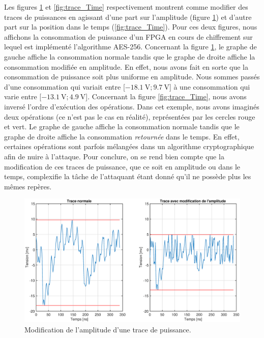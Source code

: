 \documentclass[oneside]{book}
\begin{document}
\newpage

Les figures \ref{fig:trace_Amplitude} et \ref{fig:trace_Time} respectivement montrent comme modifier des traces de puissances en agissant d'une part sur l'amplitude (figure \ref{fig:trace_Amplitude}) et d'autre part sur la position dans le temps (\ref{fig:trace_Time}). Pour ces deux figures, nous affichons la consommation de puissance d'un FPGA en cours de chiffrement sur lequel est implémenté l'algorithme AES-256. Concernant la figure \ref{fig:trace_Amplitude}, le graphe de gauche affiche la consommation normale tandis que le graphe de droite affiche la consommation modifiée en amplitude. En effet, nous avons fait en sorte que la consommation de puissance soit plus uniforme en amplitude. Nous sommes passés d'une consommation qui variait entre [$\SI{-18.1}{\volt} ; \SI{9.7}{\volt} $] à une consommation qui varie entre [$\SI{-13.1}{\volt} ; \SI{4.9}{\volt} $]. Concernant la figure \ref{fig:trace_Time}, nous avons inversé l'ordre d'exécution des opérations. Dans cet exemple, nous avons imaginés deux opérations (ce n'est pas le cas en réalité), représentées par les cercles rouge et vert. Le graphe de gauche affiche la consommation normale tandis que le graphe de droite affiche la consommation \textit{retournée} dans le temps. En effet, certaines opérations sont parfois mélangées dans un algorithme cryptographique afin de nuire à l'attaque. Pour conclure, on se rend bien compte que la modification de ces traces de puissance, que ce soit en amplitude ou dans le temps, complexifie la tâche de l'attaquant étant donné qu'il ne possède plus les mêmes repères.
\begin{figure}[htbp]
    \centering
    \includegraphics[scale=0.3]{image/trace_Amplitude}
    \caption{Modification de l'amplitude d'une trace de puissance.}
    \label{fig:trace_Amplitude}
\end{figure}
\end{document}
